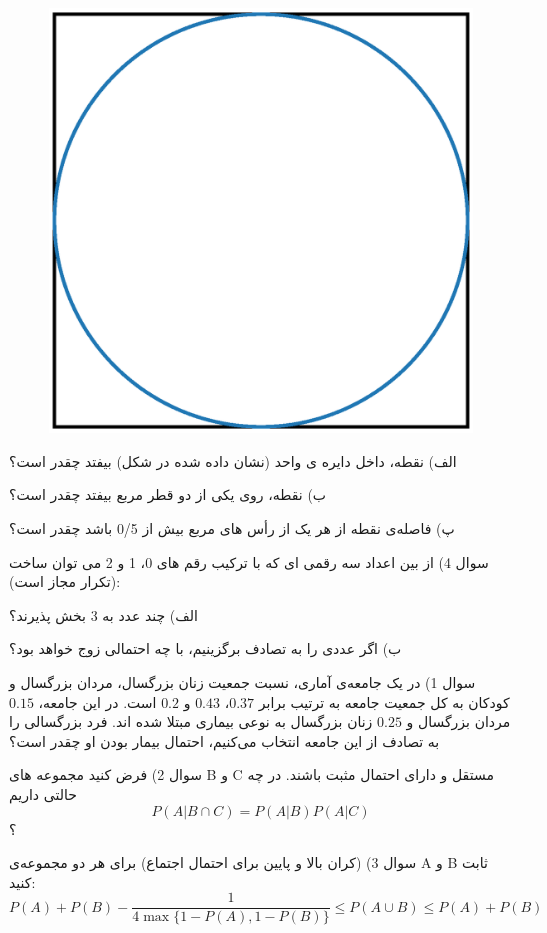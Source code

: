 \documentclass[10pt,letterpaper]{article}
\begin{document}
\begin{figure}[h!]
\centering
\includegraphics[width=130mm]{figure_1}
\end{figure}

الف) نقطه، داخل دایره ی واحد (نشان داده شده در شکل) بیفتد چقدر است؟

ب) نقطه، روی یکی از دو قطر مربع بیفتد چقدر است؟

پ) فاصله‌ی نقطه از هر یک از رأس های مربع بیش از 0/5 باشد چقدر است؟

سوال 4) از بین اعداد سه رقمی ای که با ترکیب رقم های 0، 1 و  2 می توان ساخت (تکرار مجاز است):

الف) چند عدد به 3 بخش پذیرند؟

ب) اگر عددی را به تصادف برگزینیم، با چه احتمالی زوج خواهد بود؟

سوال 1) در یک جامعه‌ی آماری، نسبت جمعیت زنان بزرگسال، مردان بزرگسال و کودکان به کل جمعیت جامعه به ترتیب برابر $0.37$، $0.43$ و $0.2$ است. در این جامعه، $0.15$ مردان بزرگسال و $0.25$ زنان بزرگسال به نوعی بیماری مبتلا شده اند. فرد بزرگسالی را به تصادف از این جامعه انتخاب می‌کنیم، احتمال بیمار بودن او چقدر است؟

سوال 2) فرض کنید مجموعه های B و C مستقل و دارای احتمال مثبت باشند. در چه حالتی داریم
$$
P(A|B\cap C)=P(A|B)P(A|C)
$$
؟

سوال 3) (کران بالا و پایین برای احتمال اجتماع) برای هر دو مجموعه‌ی A و B ثابت کنید:
$$
P(A)+P(B)-\frac{1}{4\max\{1-P(A),1-P(B)\}}
\le 
P(A\cup B)
\le 
P(A)+P(B)
$$
\end{document}
